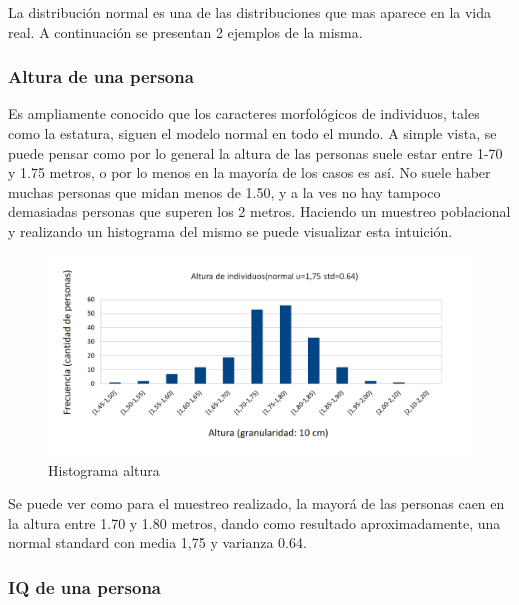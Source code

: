 La distribuci\'on normal es una de las distribuciones que mas aparece en la vida real. A continuaci\'on se presentan 2 ejemplos de la misma.
	
	\subsubsection*{Altura de una persona}
	
		Es ampliamente conocido que los caracteres morfol\'ogicos de individuos, tales como la estatura, siguen el modelo normal en todo el mundo. A simple vista, se puede pensar como por lo general la altura de las personas suele estar entre 1-70 y 1.75 metros, o por lo menos en la mayor\'ia de los casos es as\'i. No suele haber muchas personas que midan menos de 1.50, y a la ves no hay tampoco demasiadas personas que superen los 2 metros. Haciendo un muestreo poblacional y realizando un histograma del mismo se puede visualizar esta intuici\'on.
	
\newpage	
		
\begin{figure}[H]
  \begin{center}
    \includegraphics[scale=.40]{imagenes/normal_ejemplo1.png}
    \caption{Histograma altura} 
    \label{fig:normal_ejemplo1}
  \end{center}
\end{figure}		
		
Se puede ver como para el muestreo realizado, la mayor\'a de las personas caen en la altura entre 1.70 y 1.80 metros, dando como resultado aproximadamente, una normal standard con media 1,75 y varianza 0.64.

	\subsubsection*{IQ de una persona}
	
